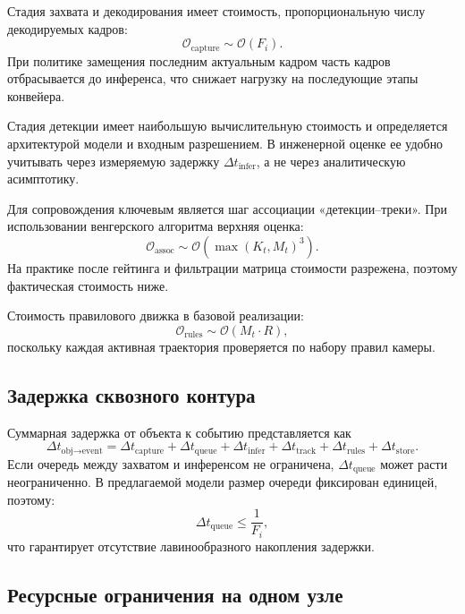 Стадия захвата и декодирования имеет стоимость, пропорциональную числу декодируемых кадров:
\begin{equation}
\mathcal{O}_{\text{capture}} \sim \mathcal{O}(F_i).
\end{equation}
При политике замещения последним актуальным кадром часть кадров отбрасывается до инференса, что снижает нагрузку на последующие этапы конвейера.

Стадия детекции имеет наибольшую вычислительную стоимость и определяется архитектурой модели и входным разрешением. В инженерной оценке ее удобно учитывать через измеряемую задержку \(\Delta t_{\text{infer}}\), а не через аналитическую асимптотику.

Для сопровождения ключевым является шаг ассоциации «детекции--треки». При использовании венгерского алгоритма верхняя оценка:
\begin{equation}
\mathcal{O}_{\text{assoc}} \sim \mathcal{O}(\max(K_t, M_t)^3).
\end{equation}
На практике после гейтинга и фильтрации матрица стоимости разрежена, поэтому фактическая стоимость ниже.

Стоимость правилового движка в базовой реализации:
\begin{equation}
\mathcal{O}_{\text{rules}} \sim \mathcal{O}(M_t \cdot R),
\end{equation}
поскольку каждая активная траектория проверяется по набору правил камеры.

\subsection{Задержка сквозного контура}

Суммарная задержка от объекта к событию представляется как
\begin{equation}
\Delta t_{\text{obj}\to\text{event}} =
\Delta t_{\text{capture}} +
\Delta t_{\text{queue}} +
\Delta t_{\text{infer}} +
\Delta t_{\text{track}} +
\Delta t_{\text{rules}} +
\Delta t_{\text{store}}.
\end{equation}
Если очередь между захватом и инференсом не ограничена, \(\Delta t_{\text{queue}}\) может расти неограниченно. В предлагаемой модели размер очереди фиксирован единицей, поэтому:
\begin{equation}
\Delta t_{\text{queue}} \le \frac{1}{F_i},
\end{equation}
что гарантирует отсутствие лавинообразного накопления задержки.

\subsection{Ресурсные ограничения на одном узле}

